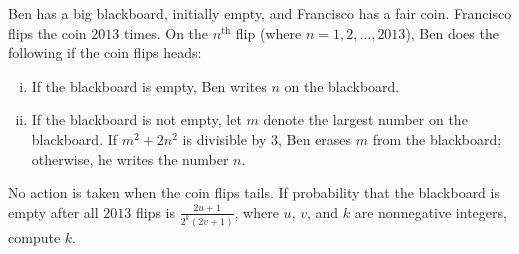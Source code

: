 Ben has a big blackboard, initially empty, and Francisco has a fair coin. Francisco flips the coin $2013$ times. On the $n^{\text{th}}$ flip (where $n=1,2,\dots,2013$), Ben does the following if the coin flips heads:
\begin{enumerate}[(i)]
	\item If the blackboard is empty, Ben writes $n$ on the blackboard.
	\item If the blackboard is not empty,
	let $m$ denote the largest number on the blackboard.  
	If $m^2+2n^2$ is divisible by $3$, Ben erases $m$ from the blackboard;
	otherwise, he writes the number $n$.
\end{enumerate}
No action is taken when the coin flips tails. If probability that the blackboard is empty after all $2013$ flips is $\frac{2u+1}{2^k(2v+1)}$, where $u$, $v$, and $k$ are nonnegative integers, compute $k$.

